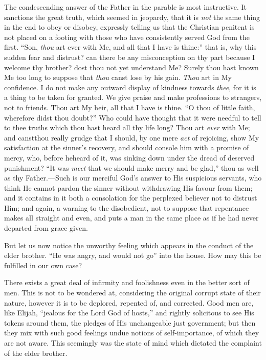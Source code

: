 The condescending answer of the Father in the parable is most
instructive. It sanctions the great truth, which seemed in jeopardy,
that it is \emph{not} the same thing in the end to obey or disobey,
expressly telling us that the Christian penitent is not placed on a
footing with those who have consistently served God from the first.
``Son, \emph{thou} art ever with Me, and all that I have is
thine:'' that is, why this sudden fear and distrust? can there be
any misconception on thy part because I welcome thy brother? dost thou
not yet understand Me? Surely thou hast known Me too long to suppose
that \emph{thou} canst lose by his gain. \emph{Thou} art in My
confidence. I do not make any outward display of kindness towards \emph{thee},
for it is a thing to be taken for granted. We give praise and make
professions to strangers, not to friends. Thou art My heir, all that I
have is thine. ``O thou of little faith, wherefore didst thou
doubt?'' Who could have thought that it were needful to tell to
thee truths which thou hast heard all thy life long? Thou art \emph{ever}
with Me; and canst\emph{}thou really grudge that I should, by one
mere \emph{act} of rejoicing, show My satisfaction at the sinner's
recovery, and should console him with a promise of mercy, who, before
he\emph{}heard of it, was sinking down under the dread of deserved
punishment? ``It was \emph{meet} that we should make merry and be
glad,'' thou as well as thy Father.—Such is our merciful God's
answer to His suspicious servants, who think He cannot pardon the
sinner without withdrawing His favour from them; and it contains in it
both a consolation for the perplexed believer not to distrust Him; and
again, a warning to the disobedient, not to suppose that repentance
makes all straight and even, and puts a man in the same place as if he
had never departed from grace given.

But let us now notice the unworthy feeling which appears in the
conduct of the elder brother. ``He was angry, and would not
go'' into the house. How may this be fulfilled in our own case?

There exists a great deal of infirmity and foolishness even in the
better sort of men. This is not to be wondered at, considering the
original corrupt state of their nature, however it is to be deplored,
repented of, and corrected. Good men are, like Elijah, ``jealous
for the Lord God of hosts,'' and rightly solicitous to see His
tokens around them, the pledges of His unchangeable just government;
but then they mix with such good feelings undue notions of
self-importance, of which they are not aware. This seemingly was the
state of mind which dictated the complaint of the elder brother.

